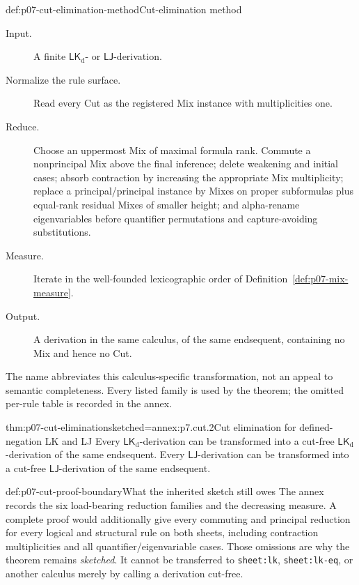 \begin{hbmethod}{def:p07-cut-elimination-method}{Cut-elimination method}
\begin{description}
  \item[Input.] A finite \(\mathsf{LK}_{\mathrm d}\)- or
        \(\mathsf{LJ}\)-derivation.
  \item[Normalize the rule surface.] Read every Cut as the registered Mix
        instance with multiplicities one.
  \item[Reduce.] Choose an uppermost Mix of maximal formula rank.  Commute a
        nonprincipal Mix above the final inference; delete weakening and
        initial cases; absorb contraction by increasing the appropriate Mix
        multiplicity; replace a principal/principal instance by Mixes on
        proper subformulas plus equal-rank residual Mixes of smaller height;
        and alpha-rename eigenvariables before quantifier permutations and
        capture-avoiding substitutions.
  \item[Measure.] Iterate in the well-founded lexicographic order of
        Definition~\ref{def:p07-mix-measure}.
  \item[Output.] A derivation in the same calculus, of the same endsequent,
        containing no Mix and hence no Cut.
\end{description}
The name abbreviates this calculus-specific transformation, not an appeal to
semantic completeness.  Every listed family is used by the theorem; the
omitted per-rule table is recorded in the annex.
\end{hbmethod}

\begin{hbtheorem}{thm:p07-cut-elimination}{sketched=annex:p7.cut.2}{Cut elimination for defined-negation LK and LJ}
Every \(\mathsf{LK}_{\mathrm d}\)-derivation can be transformed into a
cut-free \(\mathsf{LK}_{\mathrm d}\)-derivation of the same endsequent.
Every \(\mathsf{LJ}\)-derivation can be transformed into a cut-free
\(\mathsf{LJ}\)-derivation of the same endsequent.
\end{hbtheorem}

\begin{proofboundary}{def:p07-cut-proof-boundary}{What the inherited sketch still owes}
The annex records the six load-bearing reduction families and the decreasing
measure.  A complete proof would additionally give every commuting and
principal reduction for every logical and structural rule on both sheets,
including contraction multiplicities and all quantifier/eigenvariable cases.
Those omissions are why the theorem remains \emph{sketched}.  It cannot be
transferred to \texttt{sheet:lk}, \texttt{sheet:lk-eq}, or another calculus
merely by calling a derivation cut-free.
\end{proofboundary}

